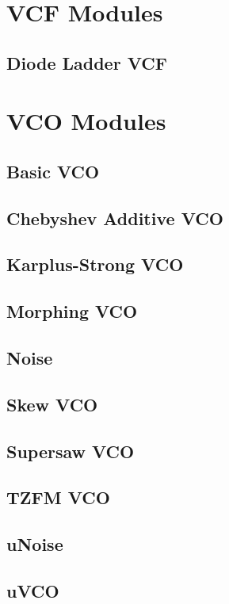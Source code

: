 \documentclass[11pt]{book}
\begin{document}
\chapter{VCF Modules}
\section{Diode Ladder VCF}

\chapter{VCO Modules}
\section{Basic VCO}
\section{Chebyshev Additive VCO}
\section{Karplus-Strong VCO}
\section{Morphing VCO}
\section{Noise}
\section{Skew VCO}
\section{Supersaw VCO}
\section{TZFM VCO}
\section{uNoise}
\section{uVCO}
\end{document}
